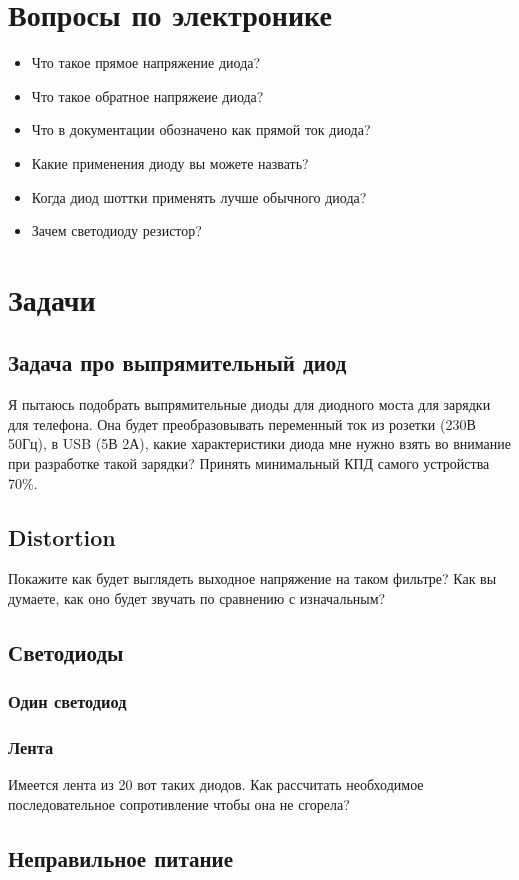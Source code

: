 \documentclass[a4paper,12pt]{article} %
\begin{document}
\section{Вопросы по электронике}

\begin{itemize}
  \item Что такое прямое напряжение диода?
  \item Что такое обратное напряжеие диода?
  \item Что в документации обозначено как прямой ток диода?
  \item Какие применения диоду вы можете назвать?
  \item Когда диод шоттки применять лучше обычного диода?
  \item Зачем светодиоду резистор?
\end{itemize}

\section{Задачи}
  \subsection{Задача про выпрямительный диод}
Я пытаюсь подобрать выпрямительные диоды для диодного моста для зарядки для телефона. Она будет преобразовывать переменный ток из розетки (230В 50Гц), в USB (5В 2А), какие характеристики диода мне нужно взять во внимание при разработке такой зарядки? Принять минимальный КПД самого устройства 70\%.

  \subsection{Distortion}
  Покажите как будет выглядеть выходное напряжение на таком фильтре? Как вы думаете, как оно будет звучать по сравнению с изначальным?

  \subsection{Светодиоды}

  \subsubsection{Один светодиод}

  \subsubsection{ Лента}
  Имеется лента из 20 вот таких диодов. Как рассчитать необходимое последовательное сопротивление чтобы она не сгорела?



  \subsection{Неправильное питание}
\end{document}
